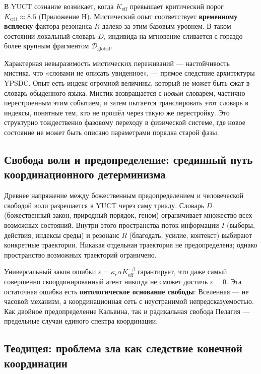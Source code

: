 \documentclass[12pt,a4paper]{article}
\begin{document}
	В YUCT сознание возникает, когда \(K_{\mathrm{eff}}\) превышает критический порог \(K_{\mathrm{crit}} \approx 8.5\) (Приложение H). Мистический опыт соответствует \textbf{временному всплеску} фактора резонанса \(R\) далеко за этим базовым уровнем. В таком состоянии локальный словарь \(D_i\) индивида на мгновение сливается с гораздо более крупным фрагментом \(\mathcal{D}_{\text{global}}\).
	
	Характерная невыразимость мистических переживаний — настойчивость мистика, что «словами не описать увиденное», — прямое следствие архитектуры YPSDC. Опыт есть индекс огромной величины, который не может быть сжат в словарь обыденного языка. Мистик возвращается с \emph{новым} словарём, частично перестроенным этим событием, и затем пытается транслировать этот словарь в индексы, понятные тем, кто не прошёл через такую же перестройку. Это структурно тождественно фазовому переходу в физической системе, где новое состояние не может быть описано параметрами порядка старой фазы.
	
	\subsection{Свобода воли и предопределение: срединный путь координационного детерминизма}
	
	Древнее напряжение между божественным предопределением и человеческой свободой воли разрешается в YUCT через саму триаду. Словарь \(D\) (божественный закон, природный порядок, геном) ограничивает множество всех возможных состояний. Внутри этого пространства поток информации \(I\) (выборы, действия, индексы среды) и резонанс \(R\) (благодать, усилие, контекст) выбирают конкретные траектории. Никакая отдельная траектория не предопределена; однако пространство возможных траекторий ограничено.
	
	Универсальный закон ошибки \(\varepsilon = \kappa_c \alpha K_{\mathrm{eff}}^{-\beta}\) гарантирует, что даже самый совершенно скоординированный агент никогда не сможет достичь \(\varepsilon = 0\). Эта остаточная ошибка есть \textbf{онтологическое основание свободы}: Вселенная — не часовой механизм, а координационная сеть с неустранимой непредсказуемостью. Как двойное предопределение Кальвина, так и радикальная свобода Пелагия — предельные случаи единого спектра координации.
	
	\subsection{Теодицея: проблема зла как следствие конечной координации}
	
\end{document}
